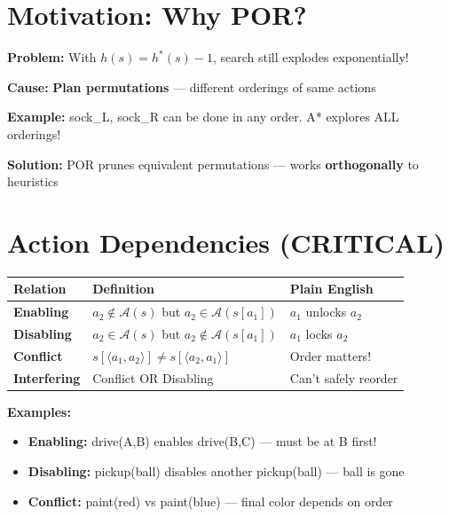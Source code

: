 \documentclass[11pt,a4paper]{article}
\begin{document}
\renewcommand{\thesection}{F.\arabic{section}}

\section{Motivation: Why POR?}

\begin{warningbox}
\textbf{Problem:} With $h(s) = h^*(s) - 1$, search still explodes exponentially!

\textbf{Cause:} \textbf{Plan permutations} --- different orderings of same actions

\textbf{Example:} sock\_L, sock\_R can be done in any order. A* explores ALL orderings!

\textbf{Solution:} POR prunes equivalent permutations --- works \textbf{orthogonally} to heuristics
\end{warningbox}

\section{Action Dependencies (CRITICAL)}

\begin{definitionbox}
\begin{center}
\begin{tabular}{@{}lp{6cm}p{4cm}@{}}
\toprule
\textbf{Relation} & \textbf{Definition} & \textbf{Plain English} \\
\midrule
\textbf{Enabling} & $a_2 \notin \mathcal{A}(s)$ but $a_2 \in \mathcal{A}(s[a_1])$ & $a_1$ unlocks $a_2$ \\
\textbf{Disabling} & $a_2 \in \mathcal{A}(s)$ but $a_2 \notin \mathcal{A}(s[a_1])$ & $a_1$ locks $a_2$ \\
\textbf{Conflict} & $s[\langle a_1, a_2 \rangle] \neq s[\langle a_2, a_1 \rangle]$ & Order matters! \\
\textbf{Interfering} & Conflict OR Disabling & Can't safely reorder \\
\bottomrule
\end{tabular}
\end{center}

\textbf{Examples:}
\begin{itemize}[leftmargin=*,nosep]
\item \textbf{Enabling:} drive(A,B) enables drive(B,C) --- must be at B first!
\item \textbf{Disabling:} pickup(ball) disables another pickup(ball) --- ball is gone
\item \textbf{Conflict:} paint(red) vs paint(blue) --- final color depends on order
\end{itemize}
\end{definitionbox}
\end{document}
